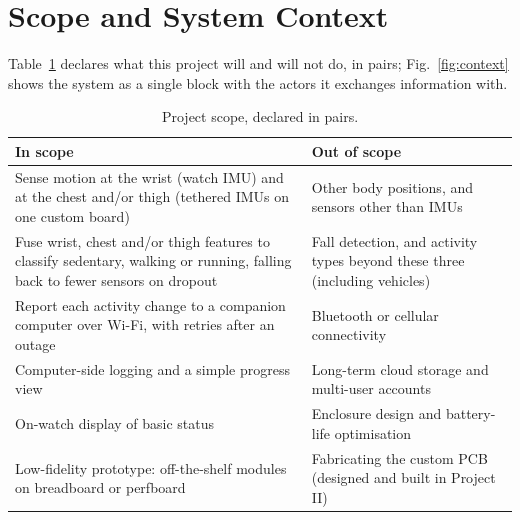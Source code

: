 \section{Scope and System Context}
\label{sec:scope}

Table~\ref{tab:scope} declares what this project will and will
not do, in pairs; Fig.~\ref{fig:context} shows the system as a
single block with the actors it exchanges information with.

\begin{table}[h]
\centering
\caption{Project scope, declared in pairs.}
\label{tab:scope}
\begin{tabular}{p{3.7cm}p{3.7cm}}
\toprule
\textbf{In scope} & \textbf{Out of scope} \\
\midrule
Sense motion at the wrist (watch IMU) and at the chest and/or
thigh (tethered IMUs on one custom board) &
Other body positions, and sensors other than IMUs \\
Fuse wrist, chest and/or thigh features to classify sedentary,
walking or running, falling back to fewer sensors on dropout &
Fall detection, and activity types beyond these three
(including vehicles) \\
Report each activity change to a companion computer over Wi-Fi,
with retries after an outage &
Bluetooth or cellular connectivity \\
Computer-side logging and a simple progress view &
Long-term cloud storage and multi-user accounts \\
On-watch display of basic status &
Enclosure design and battery-life optimisation \\
Low-fidelity prototype: off-the-shelf modules on breadboard or
perfboard &
Fabricating the custom PCB (designed and built in Project II) \\
\bottomrule
\end{tabular}
\end{table}

